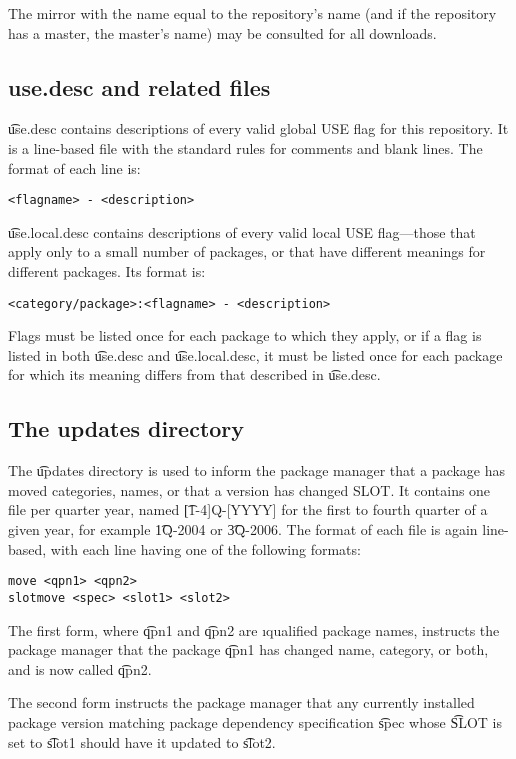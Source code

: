 The mirror with the name equal to the repository's name (and if the repository has a master,
the master's name) may be consulted for all downloads.

\subsection{use.desc and related files}
\label{use.desc}
\t{use.desc} contains descriptions of every valid global USE flag for this repository. It is a
line-based file with the standard rules for comments and blank lines. The format of each line is:
\begin{verbatim}
<flagname> - <description>
\end{verbatim}

\t{use.local.desc} contains descriptions of every valid local USE flag---those that apply only to a
small number of packages, or that have different meanings for different packages. Its format is:
\begin{verbatim}
<category/package>:<flagname> - <description>
\end{verbatim}
Flags must be listed once for each package to which they apply, or if a flag is listed in both
\t{use.desc} and \t{use.local.desc}, it must be listed once for each package for which its meaning
differs from that described in \t{use.desc}.

\subsection{The updates directory}
\label{updates-dir}
The \t{updates} directory is used to inform the package manager that a package has moved categories,
names, or that a version has changed SLOT. It contains one file per quarter year, named
\t{[1-4]Q-[YYYY]} for the first to fourth quarter of a given year, for example \t{1Q-2004} or
\t{3Q-2006}. The format of each file is again line-based, with each line having one of the following
formats:
\begin{verbatim}
move <qpn1> <qpn2>
slotmove <spec> <slot1> <slot2>
\end{verbatim}
The first form, where \t{qpn1} and \t{qpn2} are \i{qualified package names}, instructs the package
manager that the package \t{qpn1} has changed name, category, or both, and is now called \t{qpn2}.

The second form instructs the package manager that any currently installed package version matching
package dependency specification \t{spec} whose \t{SLOT} is set to \t{slot1} should have it updated
to \t{slot2}.

